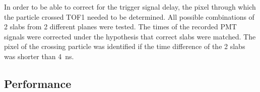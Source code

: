 In order to be able to correct for the trigger signal delay, the pixel
through which the particle crossed TOF1 needed to be determined. All
possible combinations of 2 slabs from 2 different planes were
tested. The times of the recorded PMT signals were corrected under the
hypothesis that correct slabs were matched. The pixel of the crossing
particle was identified if the time difference of the 2 slabs was
shorter than 4~ns.


\subsection{Performance}
\label{SubSect:TOF_Performance}




